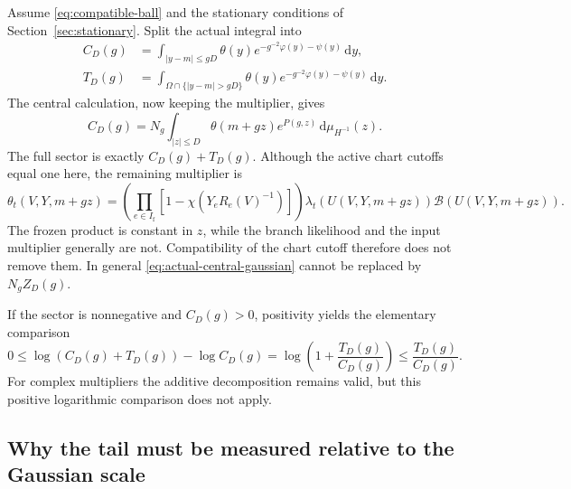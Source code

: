 \documentclass[11pt,reqno]{amsart}
\numberwithin{equation}{section}
\theoremstyle{definition}
\theoremstyle{remark}
\newcommand{\dd}{\mathrm d}
\newcommand{\If}{I_{\mathrm f}}
\begin{document}
Assume \eqref{eq:compatible-ball} and the stationary conditions of
Section~\ref{sec:stationary}. Split the actual integral into
\begin{align}
 C_D(g)&=\int_{|y-m|\le gD}
                      \theta(y)e^{-g^{-2}\varphi(y)-\psi(y)}\,\dd y,
                      \label{eq:actual-central}\\
 T_D(g)&=\int_{\Omega\cap\{|y-m|>gD\}}
                      \theta(y)e^{-g^{-2}\varphi(y)-\psi(y)}\,\dd y.
                      \label{eq:actual-tail}
\end{align}
The central calculation, now keeping the multiplier, gives
\begin{equation}
 C_D(g)=N_g\int_{|z|\le D}
                       \theta(m+gz)e^{P(g,z)}
                                        \,\dd\mu_{H^{-1}}(z).
 \label{eq:actual-central-gaussian}
\end{equation}
The full sector is exactly \(C_D(g)+T_D(g)\).
Although the active chart cutoffs equal one here, the remaining
multiplier is
\begin{equation}
 \theta_t(V,Y,m+gz)
  =\left(\prod_{e\in\If}[1-\chi(Y_eR_e(V)^{-1})]\right)
     \lambda_t(U(V,Y,m+gz))\mathcal B(U(V,Y,m+gz)).
 \label{eq:remaining-multiplier}
\end{equation}
The frozen product is constant in \(z\), while the branch likelihood
and the input multiplier generally are not. Compatibility of the
chart cutoff therefore does not remove them. In general
\eqref{eq:actual-central-gaussian} cannot be replaced by
\(N_gZ_D(g)\).

If the sector is nonnegative and \(C_D(g)>0\), positivity yields
the elementary comparison
\begin{equation}
 0\le\log(C_D(g)+T_D(g))-\log C_D(g)
       =\log\left(1+\frac{T_D(g)}{C_D(g)}\right)
       \le\frac{T_D(g)}{C_D(g)}.
 \label{eq:positive-tail-comparison}
\end{equation}
For complex multipliers the additive decomposition remains valid,
but this positive logarithmic comparison does not apply.

\subsection{Why the tail must be measured relative to the Gaussian scale}
\end{document}
